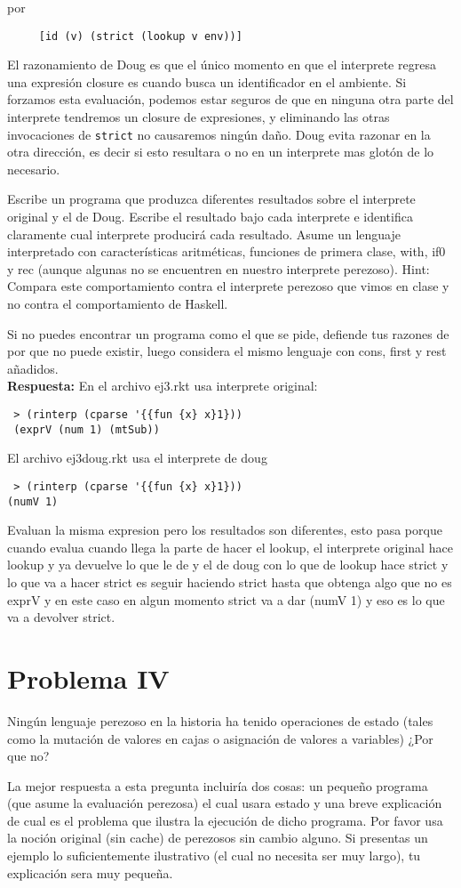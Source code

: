 \documentclass{article}
\begin{document}
por

\begin{verbatim}
     [id (v) (strict (lookup v env))]
\end{verbatim}

El razonamiento de Doug es que el único momento en que el interprete regresa una
expresión closure es cuando busca un identificador en el ambiente. Si forzamos
esta evaluación, podemos estar seguros de que en ninguna otra parte del interprete
tendremos un closure de expresiones, y eliminando las otras invocaciones de
\texttt{strict} no causaremos ningún daño. Doug evita razonar en la otra dirección,
es decir si esto resultara o no en un interprete mas glotón de lo necesario.

Escribe un programa que produzca diferentes resultados sobre el interprete original
y el de Doug. Escribe el resultado bajo cada interprete e identifica claramente
cual interprete producirá cada resultado. Asume un lenguaje interpretado
con características aritméticas, funciones de primera clase, with, if0 y rec
(aunque algunas no se encuentren en nuestro interprete perezoso). Hint: Compara
este comportamiento contra el interprete perezoso que vimos en clase y no contra
el comportamiento de Haskell.

Si no puedes encontrar un programa como el que se pide, defiende tus razones
de por que no puede existir, luego considera el mismo lenguaje con cons, first
y rest añadidos.
\\

\textbf{Respuesta: }
En el archivo ej3.rkt usa interprete original:
\begin{verbatim}
 > (rinterp (cparse '{{fun {x} x}1}))
 (exprV (num 1) (mtSub))
\end{verbatim}
El archivo ej3doug.rkt usa el interprete de doug
\begin{verbatim}
 > (rinterp (cparse '{{fun {x} x}1}))
(numV 1)
\end{verbatim}
Evaluan la misma expresion pero los resultados son diferentes, esto pasa porque cuando 
evalua cuando llega la parte de hacer el lookup, el interprete original hace lookup y
ya devuelve lo que le de y el de doug con lo que de lookup hace strict y lo que va a hacer
strict es seguir haciendo strict hasta que obtenga algo que no es exprV y en este caso
en algun momento strict va a dar (numV 1) y eso es lo que va a devolver strict. 


\section*{Problema IV}
Ningún lenguaje perezoso en la historia ha tenido operaciones de estado (tales
como la mutación de valores en cajas o asignación de valores a variables) ¿Por
que no?

La mejor respuesta a esta pregunta incluiría dos cosas: un pequeño programa (que
asume la evaluación perezosa) el cual usara estado y una breve explicación de cual
es el problema que ilustra la ejecución de dicho programa. Por favor usa la
noción original (sin cache) de perezosos sin cambio alguno. Si presentas un
ejemplo lo suficientemente ilustrativo (el cual no necesita ser muy largo), tu
explicación sera muy pequeña.
\end{document}
